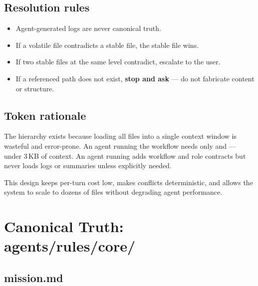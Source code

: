 \documentclass[a4paper,11pt,openany]{report}
\begin{document}
\section{Resolution rules}

\begin{itemize}
  \item Agent-generated logs are never canonical truth.
  \item If a volatile file contradicts a stable file, the stable file wins.
  \item If two stable files at the same level contradict, escalate to the user.
  \item If a referenced path does not exist, \textbf{stop and ask} --- do not
    fabricate content or structure.
\end{itemize}

\section{Token rationale}

The hierarchy exists because loading all files into a single context window is
wasteful and error-prone. An agent running the  workflow needs
only  and  --- under 3\,KB of
context. An agent running  adds workflow and role contracts
but never loads logs or summaries unless explicitly needed.

This design keeps per-turn cost low, makes conflicts deterministic, and allows
the system to scale to dozens of files without degrading agent performance.



\chapter{Canonical Truth: agents/rules/core/}
\label{ch:core}


\section{mission.md}
\end{document}
